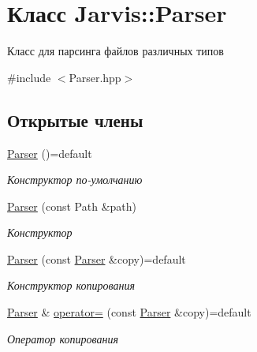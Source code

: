 \hypertarget{classJarvis_1_1Parser}{}\section{Класс Jarvis\+:\+:Parser}
\label{classJarvis_1_1Parser}


Класс для парсинга файлов различных типов  




{\ttfamily \#include $<$Parser.\+hpp$>$}

\subsection*{Открытые члены}
\begin{DoxyCompactItemize}
\item 
\mbox{\label{classJarvis_1_1Parser_a60c7c20f5314859c9f204dd5142fcf90}} 
\hyperlink{classJarvis_1_1Parser_a60c7c20f5314859c9f204dd5142fcf90}{Parser} ()=default
\begin{DoxyCompactList}\small\item\em Конструктор по-\/умолчанию \end{DoxyCompactList}\item 
\hyperlink{classJarvis_1_1Parser_ac4987517b9f2618f1c8a7ff8a91f6b77}{Parser} (const Path \&path)
\begin{DoxyCompactList}\small\item\em Конструктор \end{DoxyCompactList}\item 
\mbox{\label{classJarvis_1_1Parser_a42970c65127a01194e31175af54cd292}} 
\hyperlink{classJarvis_1_1Parser_a42970c65127a01194e31175af54cd292}{Parser} (const \hyperlink{classJarvis_1_1Parser}{Parser} \&copy)=default
\begin{DoxyCompactList}\small\item\em Конструктор копирования \end{DoxyCompactList}\item 
\mbox{\label{classJarvis_1_1Parser_a4cc69248743fb4bcaa27ebe8ca60d4bf}} 
\hyperlink{classJarvis_1_1Parser}{Parser} \& \hyperlink{classJarvis_1_1Parser_a4cc69248743fb4bcaa27ebe8ca60d4bf}{operator=} (const \hyperlink{classJarvis_1_1Parser}{Parser} \&copy)=default
\begin{DoxyCompactList}\small\item\em Оператор копирования \end{DoxyCompactList}\item 

\end{DoxyCompactItemize}
